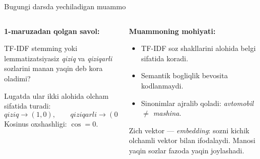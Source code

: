 \documentclass[aspectratio=169,11pt]{beamer}
\begin{document}
\begin{frame}{Bugungi darsda yechiladigan muammo}
\small

\begin{columns}[T,totalwidth=\textwidth]
  \begin{column}{0.52\textwidth}
    \textbf{1-ma\textquotesingle{}ruzadan qolgan savol:}

    \vspace{3pt}
    TF-IDF stemming yoki lemmatizatsiyasiz
    \textit{qiziq} va \textit{qiziqarli} so\textquotesingle{}zlarini
    ma\textquotesingle{}nan yaqin deb ko\textquotesingle{}ra oladimi?

    \vspace{6pt}

    \begin{tcolorbox}[alertbox,title=Javob: yo\textquotesingle{}q]
      \footnotesize
      Lug\textquotesingle{}atda ular ikki alohida o\textquotesingle{}lcham sifatida turadi:
      \[
        \textit{qiziq}\rightarrow(1,0), \qquad
        \textit{qiziqarli}\rightarrow(0,1)
      \]
      Kosinus o\textquotesingle{}xshashligi: $\cos=0$.
    \end{tcolorbox}
  \end{column}

  \begin{column}{0.44\textwidth}
    \textbf{Muammoning mohiyati:}

    \vspace{3pt}
    \begin{itemize}\setlength\itemsep{5pt}
      \item TF-IDF so\textquotesingle{}z shakllarini alohida belgi sifatida ko\textquotesingle{}radi.
      \item Semantik bog\textquotesingle{}liqlik bevosita kodlanmaydi.
      \item Sinonimlar ajralib qoladi:
            \textit{avtomobil} $\ne$ \textit{mashina}.
    \end{itemize}

    \vspace{5pt}

    \begin{tcolorbox}[defbox,title=Yechim]
      \footnotesize
      Zich vektor — \textit{embedding}: so\textquotesingle{}zni kichik
      o\textquotesingle{}lchamli vektor bilan ifodalaydi. Ma\textquotesingle{}nosi
      yaqin so\textquotesingle{}zlar fazoda yaqin joylashadi.
    \end{tcolorbox}
  \end{column}
\end{columns}

\end{frame}
\end{document}

